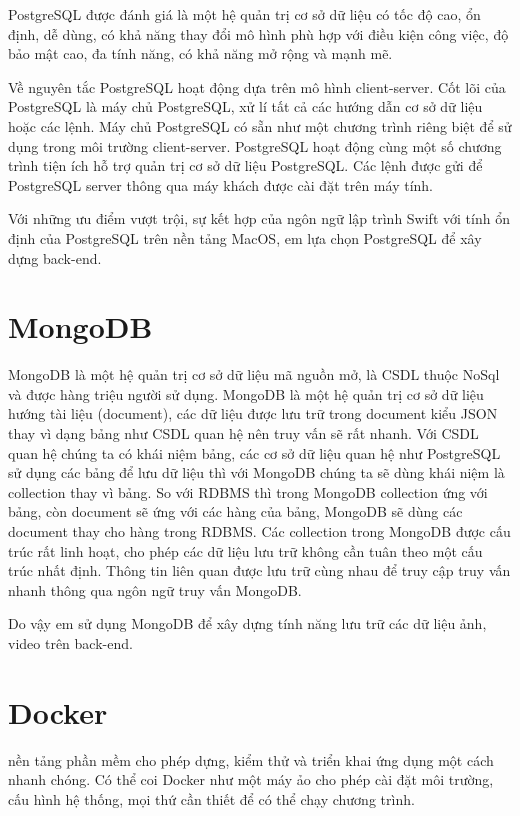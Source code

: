 \documentclass[../DoAn.tex]{subfiles}
\begin{document}
PostgreSQL được đánh giá là một hệ quản trị cơ sở dữ liệu có tốc độ cao, ổn định, dễ dùng, có khả năng thay đổi mô hình phù hợp với điều kiện công việc, độ bảo mật cao, đa tính năng, có khả năng mở rộng và mạnh mẽ.

Về nguyên tắc PostgreSQL hoạt động dựa trên mô hình client-server. Cốt lõi của PostgreSQL là máy chủ PostgreSQL, xử lí tất cả các hướng dẫn cơ sở dữ liệu hoặc các lệnh. Máy chủ PostgreSQL có sẵn như một chương trình riêng biệt để sử dụng trong môi trường client-server. PostgreSQL hoạt động cùng một số chương trình tiện ích hỗ trợ quản trị cơ sở dữ liệu PostgreSQL. Các lệnh được gửi để PostgreSQL server thông qua máy khách được cài đặt trên máy tính. 

Với những ưu điểm vượt trội, sự kết hợp của ngôn ngữ lập trình Swift với tính ổn định của PostgreSQL trên nền tảng MacOS, em lựa chọn PostgreSQL để xây dựng back-end.


\section{MongoDB}
MongoDB là một hệ quản trị cơ sở dữ liệu mã nguồn mở, là CSDL thuộc NoSql và được hàng triệu người sử dụng.
MongoDB là một hệ quản trị cơ sở dữ liệu hướng tài liệu (document), các dữ liệu được lưu trữ trong document kiểu JSON thay vì dạng bảng như CSDL quan hệ nên truy vấn sẽ rất nhanh\cite{MongoDB}.
Với CSDL quan hệ chúng ta có khái niệm bảng, các cơ sở dữ liệu quan hệ như PostgreSQL sử dụng các bảng để lưu dữ liệu thì với MongoDB chúng ta sẽ dùng khái niệm là collection thay vì bảng.
So với RDBMS thì trong MongoDB collection ứng với bảng, còn document sẽ ứng với các hàng của bảng, MongoDB sẽ dùng các document thay cho hàng trong RDBMS.
Các collection trong MongoDB được cấu trúc rất linh hoạt, cho phép các dữ liệu lưu trữ không cần tuân theo một cấu trúc nhất định.
Thông tin liên quan được lưu trữ cùng nhau để truy cập truy vấn nhanh thông qua ngôn ngữ truy vấn MongoDB.

Do vậy em sử dụng MongoDB để xây dựng tính năng lưu trữ các dữ liệu ảnh, video trên back-end.


\section{Docker}
\cite{Docker} nền tảng phần mềm cho phép dựng, kiểm thử và triển khai ứng dụng một cách nhanh chóng. Có thể coi Docker như một máy ảo cho phép cài đặt môi trường, cấu hình hệ thống, mọi thứ cần thiết để có thể chạy chương trình\cite{Docker}.
\end{document}
